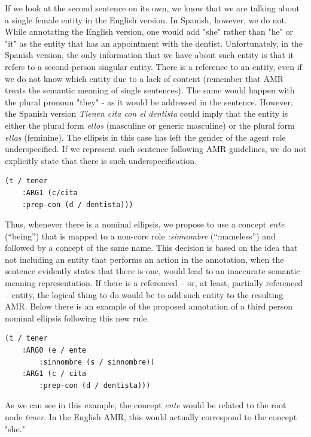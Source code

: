 \documentclass[10pt, a4paper]{article}
\begin{document}
If we look at the second sentence on its own, we know that we are talking about a single female entity in the English version. In Spanish, however, we do not. While annotating the English version, one would add "she" rather than "he" or "it" as the entity that has an appointment with the dentist. Unfortunately, in the Spanish version, the only information that we have about such entity is that it refers to a second-person singular entity. There is a reference to an entity, even if we do not know which entity due to a lack of content (remember that AMR treats the semantic meaning of single sentences). The same would happen with the plural pronoun "they" - as it would be addressed in the sentence. However, the Spanish version \textit{Tienen cita con el dentista} could imply that the entity is either the plural form \emph{ellos} (masculine or generic masculine) or the plural form \emph{ellas} (feminine). The ellipsis in this case has left the gender of the agent role underspecified. If we represent such sentence following AMR guidelines, we do not explicitly state that there is such underspecification. 

\begin{verbatim}
(t / tener
    :ARG1 (c/cita
    :prep-con (d / dentista)))
\end{verbatim}

Thus, whenever there is a nominal ellipsis, we propose to use a concept \emph{ente} (``being'') that is mapped to a non-core role \emph{:sinnombre} (``:nameless'') and followed by a concept of the same name. This decision is based on the idea that not including an entity that performs an action in the annotation, when the sentence evidently states that there is one, would lead to an inaccurate semantic meaning representation. If there is a referenced -- or, at least, partially referenced -- entity, the logical thing to do would be to add such entity to the resulting AMR. Below there is an example of the proposed annotation of a third person nominal ellipsis following this new rule.

\begin{verbatim}
(t / tener
    :ARG0 (e / ente
        :sinnombre (s / sinnombre))
    :ARG1 (c / cita
        :prep-con (d / dentista)))
\end{verbatim}

As we can see in this example, the concept \textit{ente} would be related to the root node \textit{tener}. In the English AMR, this would actually correspond to the concept "she."
\end{document}
